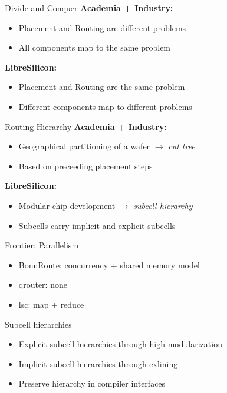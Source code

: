 \documentclass[9pt]{beamer}
\begin{document}
\begin{frame}{Divide and Conquer}
	    \textbf{Academia + Industry:}
	    \begin{itemize}
		\item Placement and Routing are different problems
		\item All components map to the same problem
	    \end{itemize}
	    \textbf{LibreSilicon:}
	    \begin{itemize}
		\item Placement and Routing are the same problem
		\item Different components map to different problems
	    \end{itemize}
\end{frame}

\begin{frame}{Routing Hierarchy}
	    \textbf{Academia + Industry:}
	    \begin{itemize}
		\item Geographical partitioning of a wafer $\rightarrow$ \textit{cut tree}
		\item Based on preceeding placement steps
	    \end{itemize}
	    \textbf{LibreSilicon:}
	    \begin{itemize}
		\item Modular chip development $\rightarrow$ \textit{subcell hierarchy}
		\item Subcells carry implicit and explicit subcells
	    \end{itemize}
\end{frame}

\begin{frame}{Frontier: Parallelism}
	\begin{itemize}
        \setlength\itemsep{1em}
		\item BonnRoute: concurrency + shared memory model
		\item qrouter: none 
		\item lsc: map + reduce
	\end{itemize}
\end{frame}

\begin{frame}{Subcell hierarchies}
	\begin{itemize}
        \setlength\itemsep{1em}
		\item Explicit subcell hierarchies through high modularization
		\item Implicit subcell hierarchies through exlining
		\item Preserve hierarchy in compiler interfaces
	\end{itemize}
\end{frame}
\end{document}
